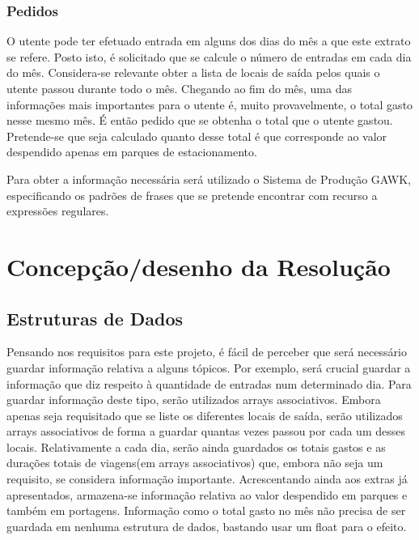 \documentclass{report}
\begin{document}
\subsection{Pedidos}
O utente pode ter efetuado entrada em alguns dos dias do mês a que este extrato se refere. 
Posto isto, é solicitado que se calcule o número de entradas em cada dia do mês.
Considera-se relevante obter a lista de locais de saída pelos quais o utente passou durante todo o mês.
Chegando ao fim do mês, uma das informações mais importantes para o utente é, muito provavelmente, o total gasto nesse mesmo mês. 
É então pedido que se obtenha o total que o utente gastou. Pretende-se que seja calculado quanto desse total é que corresponde 
ao valor despendido apenas em parques de estacionamento.\par
Para obter a informação necessária será utilizado o Sistema de Produção GAWK, especificando os padrões de frases que se pretende encontrar com recurso a expressões regulares.

\chapter{Concepção/desenho da Resolução} \label{cd}
\section{Estruturas de Dados}
Pensando nos requisitos para este projeto, é fácil de perceber que será necessário 
guardar informação relativa a alguns tópicos. Por exemplo, será crucial guardar a informação que diz respeito 
à quantidade de entradas num determinado dia. Para guardar informação deste tipo, serão utilizados arrays associativos. 
Embora apenas seja requisitado que se liste os diferentes locais de saída, serão utilizados arrays associativos de 
forma a guardar quantas vezes passou por cada um desses locais. Relativamente a cada dia, serão ainda guardados os 
totais gastos e as durações totais de viagens(em arrays associativos) que, embora não seja um requisito, se considera informação importante.
Acrescentando ainda aos extras já apresentados, armazena-se informação relativa ao valor despendido em parques e também em portagens. 
Informação como o total gasto no mês não precisa de ser guardada em nenhuma estrutura de dados, bastando usar um float para o efeito.
\end{document}
